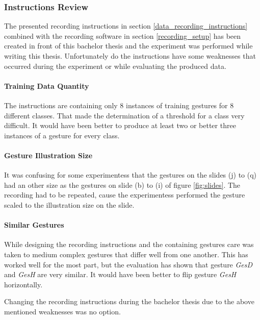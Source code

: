 \subsubsection{Instructions Review} \label{instructions_review}
The presented recording instructions in section \ref{data_recording_instructions} combined with the recording software
in section \ref{recording_setup} has been created in front of this bachelor thesis and the experiment was performed
while writing this thesis. Unfortunately do the instructions have some weaknesses that occurred during the experiment or
while evaluating the produced data.

\paragraph{Training Data Quantity} The instructions are containing only 8 instances of training gestures for 8 different
classes. That made the determination of a threshold for a class very difficult. It would have been better to produce at
least two or better three instances of a gesture for every class.

\paragraph{Gesture Illustration Size} It was confusing for some experimentess that the gestures on the slides (j) to (q)
had an other size as the gestures on slide (b) to (i) of figure \ref{fig:slides}. The recording had to be repeated,
cause the experimentess performed the gesture scaled to the illustration size on the slide.

\paragraph{Similar Gestures} While designing the recording instructions and the containing gestures care was taken to
medium complex gestures that differ well from one another. This has worked well for the most part, but the evaluation
has shown that gesture \textit{GesD} and \textit{GesH} are very similar. It would have been better to flip gesture
\textit{GesH} horizontally.

Changing the recording instructions during the bachelor thesis due to the above mentioned weaknesses was no option.
